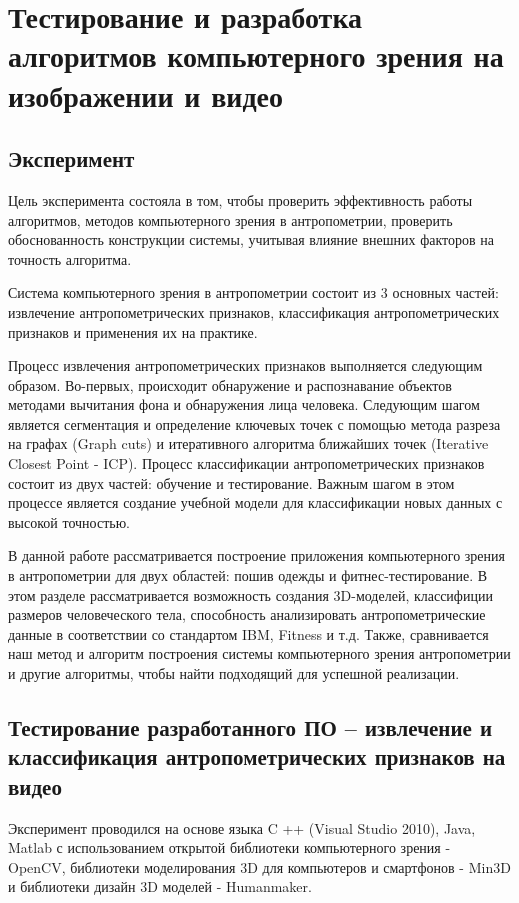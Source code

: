 \section{Тестирование и разработка алгоритмов компьютерного зрения на изображении и видео}
\subsection{Эксперимент}
Цель эксперимента состояла в том, чтобы проверить эффективность работы алгоритмов, методов компьютерного зрения в антропометрии, проверить обоснованность конструкции системы, учитывая влияние внешних факторов на точность алгоритма.

Система компьютерного зрения в антропометрии состоит из 3 основных частей: извлечение антропометрических признаков, классификация антропометрических признаков и применения их на практике. 

Процесс извлечения  антропометрических признаков выполняется следующим образом. Во-первых, происходит обнаружение и распознавание объектов методами вычитания фона и обнаружения лица человека. Следующим шагом является сегментация и определение ключевых точек с помощью метода разреза на графах (Graph cuts) и итеративного алгоритма ближайших точек (Iterative Closest Point - ICP). Процесс классификации антропометрических признаков состоит из двух частей: обучение и тестирование. Важным шагом в этом процессе является  создание учебной модели для классификации новых данных с высокой точностью. 

В данной работе рассматривается построение приложения компьютерного зрения в антропометрии для двух областей: пошив одежды и фитнес-тестирование. В этом разделе рассматривается возможность создания 3D-моделей, классифиции размеров человеческого тела, способность анализировать антропометрические данные в соответствии со стандартом IBM, Fitness и т.д. Также, сравнивается наш метод и алгоритм построения системы компьютерного зрения антропометрии и другие алгоритмы, чтобы найти подходящий для успешной реализации.

\subsection{Тестирование разработанного ПО – извлечение и классификация антропометрических признаков на видео}
Эксперимент проводился на основе языка C ++ (Visual Studio 2010), Java, Matlab с использованием открытой библиотеки компьютерного зрения - OpenCV, библиотеки моделирования 3D для компьютеров и смартфонов - Min3D и библиотеки дизайн 3D моделей - Humanmaker. 

